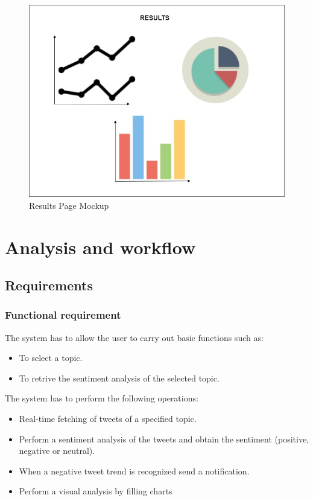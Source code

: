 \documentclass[a4paper, oneside]{article}
\begin{document}
\begin{figure}[h]
\centering
\includegraphics[width=\textwidth]{./images/diagrams/Charts} 
\caption{Results Page Mockup}
\label{fig:mockup}
\end{figure}

\clearpage

\section{Analysis and workflow}

\subsection{Requirements}

\subsubsection{Functional requirement}
The system has to allow the user to carry out basic functions such as:
\begin{itemize}
\item To select a topic.
\item To retrive the sentiment analysis of the selected topic.
\end{itemize}
The system has to perform the following operations: 
\begin{itemize}
\item Real-time fetching of tweets of a specified topic.
\item Perform a sentiment analysis of the tweets and obtain the sentiment (positive, negative or neutral).
\item When a negative tweet trend is recognized send a notification.
\item Perform a visual analysis by filling charts
\end{itemize}
\vspace{2mm}
\end{document}

